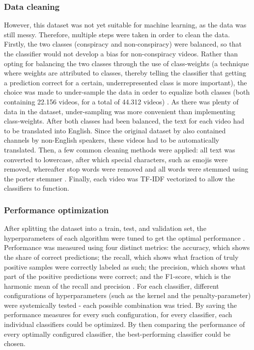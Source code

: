 \documentclass[../main.tex]{subfiles}
\begin{document}
\subsubsection{Data cleaning}
However, this dataset was not yet suitable for machine learning, as the data was still messy. Therefore,
multiple steps were taken in order to clean the data. Firstly, the two classes (conspiracy and
non-conspiracy) were balanced, so that the classifier would not develop a bias for non-conspiracy
videos. Rather than opting for balancing the two classes through the use of class-weights (a technique
where weights are attributed to classes, thereby telling the classifier that getting a prediction
correct for a certain, underrepresented class is more important), the choice
was made to under-sample the data in order to equalize both classes (both containing 22.156 videos, for
a total of 44.312 videos) \citep{lemaitre2017imbalanced, sun2006boosting}. As there was plenty of data
in the dataset, under-sampling was more convenient than implementing class-weights. After both classes
had been balanced, the text for each video had to be translated into English. Since the original dataset
by \citet{ledwich2019algorithmic} also contained channels by non-English speakers, these videos had to
be automatically translated. Then, a few common cleaning methods were applied: all text was converted to
lowercase, after which special characters, such as emojis were removed, whereafter stop words were
removed and all words were stemmed using the porter stemmer \citep{karaa2013new}. Finally, each video
was TF-IDF vectorized to allow the classifiers to function.

\subsubsection{Performance optimization}
After splitting the dataset into a train, test, and validation set, the hyperparameters of each
algorithm were tuned to get the optimal performance \citep{feurer2019hyperparameter}. Performance was
measured using four distinct metrics: the accuracy, which shows the share of correct predictions; the
recall, which shows what fraction of truly positive samples were correctly labeled as such; the
precision, which shows what part of the positive predictions were correct; and the F1-score, which is
the harmonic mean of the recall and precision \citep{sokolova2009systematic}. For each classifier,
different configurations of hyperparameters (such as the kernel and the penalty-parameter) were
systemically tested - each possible combination was tried. By saving the performance measures for every
such configuration, for every classifier, each individual classifiers could be optimized. By then
comparing the performance of every optimally configured classifier, the best-performing classifier could
be chosen. 
\end{document}
